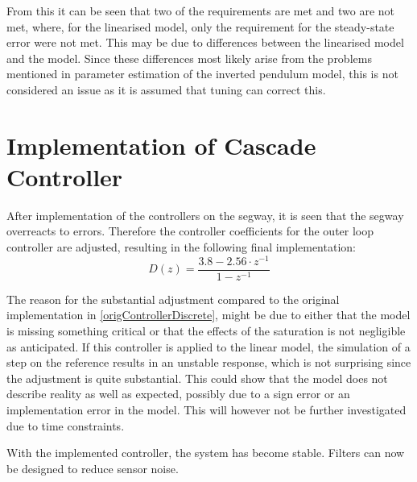 From this it can be seen that two of the requirements are met and two are not met, where, for the linearised model, only the requirement for the steady-state error were not met. This may be due to differences between the linearised model and the model. Since these differences most likely arise from the problems mentioned in parameter estimation of the inverted pendulum model, this is not considered an issue as it is assumed that tuning can correct this.


\section{Implementation of Cascade Controller}
After implementation of the controllers on the segway, it is seen that the segway overreacts to errors. Therefore the controller coefficients for the outer loop controller are adjusted, resulting in the following final implementation:
\begin{equation}
D(z)=\frac{3.8-2.56\cdot z^{-1}}{1-z^{-1}}
\end{equation}

The reason for the substantial adjustment compared to the original implementation in \autoref{origControllerDiscrete}, might be due to either that the model is missing something critical or that the effects of the saturation is not negligible as anticipated. If this controller is applied to the linear model, the simulation of a step on the reference results in an unstable response, which is not surprising since the adjustment is quite substantial. This could show that the model does not describe reality as well as expected, possibly due to a sign error or an implementation error in the model. This will however not be further investigated due to time constraints.

With the implemented controller, the system has become stable. Filters can now be designed to reduce sensor noise.
